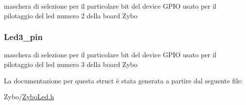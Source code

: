 maschera di selezione per il particolare bit del device G\+P\+I\+O usato per il pilotaggio del led numero 2 della board Zybo \hypertarget{struct_zybo_led__t_afc64d1407f30615e374bf9f06721842a}{
\subsubsection[{Led3\+\_\+pin}]{ Led3\+\_\+pin}}\label{struct_zybo_led__t_afc64d1407f30615e374bf9f06721842a}
maschera di selezione per il particolare bit del device G\+P\+I\+O usato per il pilotaggio del led numero 3 della board Zybo 

La documentazione per questa struct è stata generata a partire dal seguente file\+:\begin{DoxyCompactItemize}
\item 
Zybo/\hyperlink{_zybo_led_8h}{Zybo\+Led.\+h}\end{DoxyCompactItemize}
